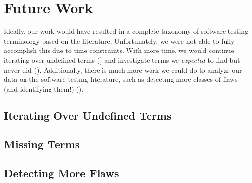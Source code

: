 \section{Future Work}\label{future-work}

Ideally, our work would have resulted in a complete taxonomy of software
testing terminology based on the literature. Unfortunately, we were not able to
fully accomplish this due to time constraints. With more time, we would
continue iterating over undefined terms () and
investigate terms we \emph{expected} to find but never did
(). Additionally, there is much more work we could do
to analyze our data on the software testing literature, such as detecting
more classes of flaws (and identifying them!) ().

\subsection{Iterating Over Undefined Terms}\label{future-undef-terms}

\subsection{Missing Terms}\label{future-miss-terms}

\subsection{Detecting More Flaws}\label{future-detect-flaws}

